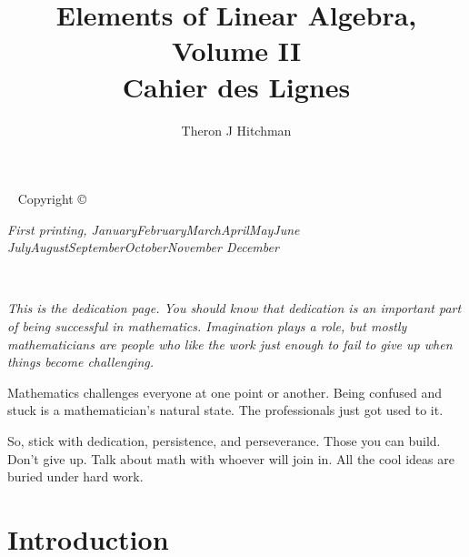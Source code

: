 \documentclass{tufte-book}
\title{Elements of Linear Algebra, Volume II\\Cahier des Lignes}
\author[TJH]{Theron J Hitchman}
\newcommand{\monthyear}{%
  \ifcase\month\or January\or February\or March\or April\or May\or June\or
  July\or August\or September\or October\or November\or
  December\fi\space\number\year
}
\newcommand{\openepigraph}[2]{%
  \begin{fullwidth}
  \sffamily\large
  \begin{doublespace}
  \noindent\allcaps{#1}\\%
  \noindent\allcaps{#2}%
  \end{doublespace}
  \end{fullwidth}
}
\newcommand{\blankpage}{\newpage\hbox{}\thispagestyle{empty}\newpage}
\theoremstyle{definition}
\begin{document}
\frontmatter


%



\maketitle


\newpage
\begin{fullwidth}
~\vfill
\thispagestyle{empty}
\setlength{\parindent}{0pt}
\setlength{\parskip}{\baselineskip}
Copyright \copyright\ \the\year\ \thanklessauthor

\par{}

\par{}


\par\textit{First printing, \monthyear}
\end{fullwidth}

\tableofcontents

\cleardoublepage
~\vfill
\begin{doublespace}
\noindent\fontsize{18}{22}\selectfont\itshape
\nohyphenation
This is the dedication page. You should know that dedication is an important part of 
being successful in mathematics. Imagination plays a role, but mostly mathematicians are people who like the work just enough to fail to give up when things become challenging. 

Mathematics challenges everyone at one point or another. Being confused and stuck is 
a mathematician's natural state. The professionals just got used to it. 

So, stick with dedication, persistence, and perseverance. Those you can build. Don't give up. Talk about math with whoever will join in. All the cool ideas are buried under hard work.
\end{doublespace}
\vfill
\vfill


\cleardoublepage
\chapter*{Introduction}
\end{document}
